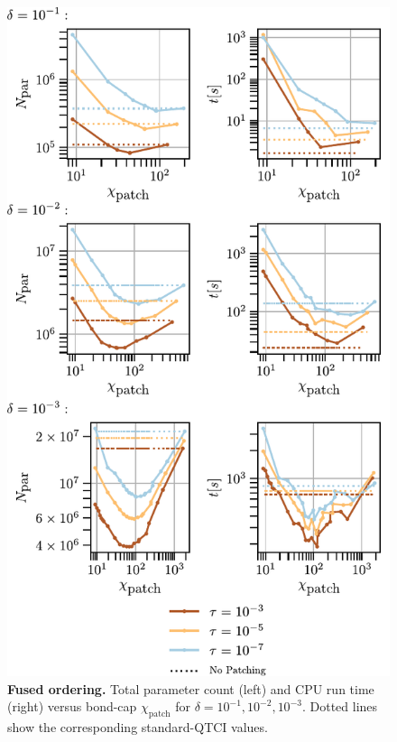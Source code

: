 \begin{figure}[ht!]
    \centering
    \includegraphics{figures/2DGreenMemoryTimeFused.pdf}
    \caption{ \textbf{Fused ordering.} Total parameter count (left) and CPU run time (right) versus bond-cap \(\chi_{\text{patch}}\) for \(\delta=10^{-1},10^{-2},10^{-3}\). Dotted lines show the corresponding standard-QTCI values. }
    \label{fig:memoryTime2DGreenFused}
\end{figure}

